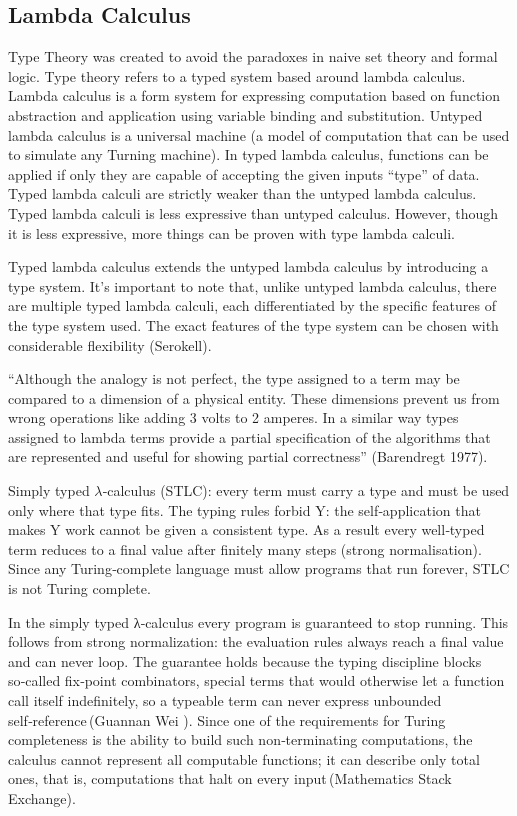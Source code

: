 \documentclass{article}
\begin{document}
\subsection{Lambda Calculus}

Type Theory was created to avoid the paradoxes in naive set theory and formal logic. Type theory refers to a typed system based around lambda calculus. Lambda calculus is a form system for expressing computation based on function abstraction and application using variable binding and substitution. Untyped lambda calculus is a universal machine (a model of computation that can be used to simulate any Turning machine). In typed lambda calculus, functions can be applied if only they are capable of accepting the given inputs “type” of data. Typed lambda calculi are strictly weaker than the untyped lambda calculus.  Typed lambda calculi is less expressive than untyped calculus. However, though it is less expressive, more things can be proven with type lambda calculi. 

Typed lambda calculus extends the untyped lambda calculus by introducing a type system. It’s important to note that, unlike untyped lambda calculus, there are multiple typed lambda calculi, each differentiated by the specific features of the type system used. The exact features of the type system can be chosen with considerable flexibility (Serokell).  

“Although the analogy is not perfect, the type assigned to a term may be compared to a dimension of a physical entity. These dimensions prevent us from wrong operations like adding 3 volts to 2 amperes. In a similar way types assigned to lambda terms provide a partial specification of the algorithms that are represented and useful for showing partial correctness” (Barendregt 1977). 

Simply typed $\lambda$‑calculus (STLC): every term must carry a type and must be used only where that type fits. The typing rules forbid Y: the self‑application that makes Y work cannot be given a consistent type. As a result every well‑typed term reduces to a final value after finitely many steps (strong normalisation). Since any Turing‑complete language must allow programs that run forever, STLC is not Turing complete.

In the simply typed λ‑calculus every program is guaranteed to stop running. This follows from strong normalization: the evaluation rules always reach a final value and can never loop. The guarantee holds because the typing discipline blocks so‑called fix‑point combinators, special terms that would otherwise let a function call itself indefinitely, so a typeable term can never express unbounded self‑reference (Guannan Wei ). Since one of the requirements for Turing completeness is the ability to build such non‑terminating computations, the calculus cannot represent all computable functions; it can describe only total ones, that is, computations that halt on every input (Mathematics Stack Exchange).
\end{document}
